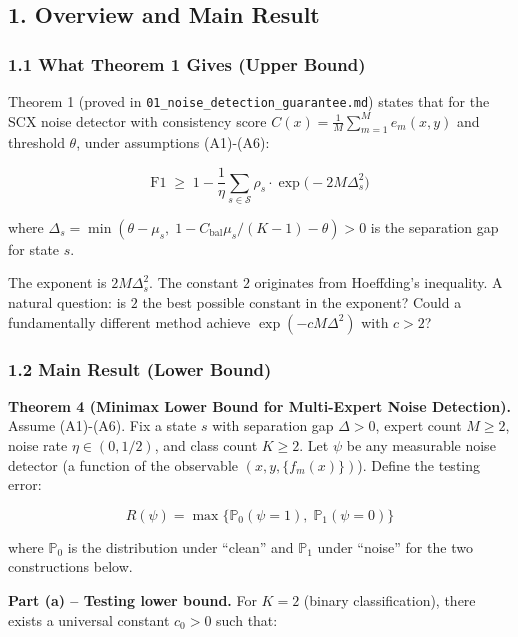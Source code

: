 \documentclass[
  12pt,
]{article}
\begin{document}
\subsection{1. Overview and Main Result}\label{overview-and-main-result}

\subsubsection{1.1 What Theorem 1 Gives (Upper
Bound)}\label{what-theorem-1-gives-upper-bound}

Theorem 1 (proved in \texttt{01\_noise\_detection\_guarantee.md}) states
that for the SCX noise detector with consistency score
\(C(x) = \frac{1}{M}\sum_{m=1}^M e_m(x,y)\) and threshold \(\theta\),
under assumptions (A1)-(A6):

\[\text{F1} \;\geq\; 1 - \frac{1}{\eta} \sum_{s \in \mathcal{S}} \rho_s \cdot \exp\!\bigl(-2M\Delta_s^2\bigr)\]

where
\(\Delta_s = \min(\theta - \mu_s,\; 1 - C_{\text{bal}}\mu_s/(K-1) - \theta) > 0\)
is the separation gap for state \(s\).

The exponent is \(2M\Delta_s^2\). The constant \(2\) originates from
Hoeffding's inequality. A natural question: is \(2\) the best possible
constant in the exponent? Could a fundamentally different method achieve
\(\exp(-cM\Delta^2)\) with \(c > 2\)?

\subsubsection{1.2 Main Result (Lower
Bound)}\label{main-result-lower-bound}

\textbf{Theorem 4 (Minimax Lower Bound for Multi-Expert Noise
Detection).} Assume (A1)-(A6). Fix a state \(s\) with separation gap
\(\Delta > 0\), expert count \(M \geq 2\), noise rate
\(\eta \in (0, 1/2)\), and class count \(K \geq 2\). Let \(\psi\) be any
measurable noise detector (a function of the observable
\((x, y, \{f_m(x)\})\)). Define the testing error:

\[R(\psi) = \max\bigl\{\mathbb{P}_0(\psi = 1),\; \mathbb{P}_1(\psi = 0)\bigr\}\]

where \(\mathbb{P}_0\) is the distribution under ``clean'' and
\(\mathbb{P}_1\) under ``noise'' for the two constructions below.

\textbf{Part (a) -- Testing lower bound.} For \(K=2\) (binary
classification), there exists a universal constant \(c_0 > 0\) such
that:
\end{document}
